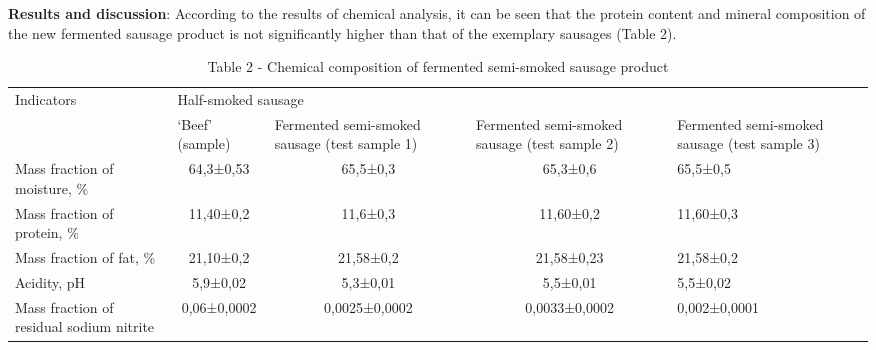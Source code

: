 {\bfseries Results and discussion}: According to the results of chemical
analysis, it can be seen that the protein content and mineral
composition of the new fermented sausage product is not significantly
higher than that of the exemplary sausages (Table 2).

\begin{table}[H]
\caption*{Table 2 - Chemical composition of fermented semi-smoked sausage product}
\centering
\begin{tabular}{|l|llll|}
\hline
\multirow{2}{*}{Indicators}              & \multicolumn{4}{l|}{Half-smoked sausage}                                                                                                                                                                                       \\ \cline{2-5} 
                                         & \multicolumn{1}{l|}{‘Beef’ (sample)} & \multicolumn{1}{p{0.15\textwidth}|}{Fermented semi-smoked sausage (test sample 1)} & \multicolumn{1}{p{0.15\textwidth}|}{Fermented semi-smoked sausage (test sample 2)} & \multicolumn{1}{p{0.15\textwidth}|}{Fermented semi-smoked sausage (test sample 3)} \\ \hline
Mass fraction of moisture, \%            & \multicolumn{1}{c|}{64,3±0,53}       & \multicolumn{1}{c|}{65,5±0,3}                                      & \multicolumn{1}{c|}{65,3±0,6}                                      & 65,5±0,5                                      \\ \hline
Mass fraction of protein, \%             & \multicolumn{1}{c|}{11,40±0,2}       & \multicolumn{1}{c|}{11,6±0,3}                                      & \multicolumn{1}{c|}{11,60±0,2}                                     & 11,60±0,3                                     \\ \hline
Mass fraction of fat, \%                 & \multicolumn{1}{c|}{21,10±0,2}       & \multicolumn{1}{c|}{21,58±0,2}                                     & \multicolumn{1}{c|}{21,58±0,23}                                    & 21,58±0,2                                     \\ \hline
Acidity, pH                              & \multicolumn{1}{c|}{5,9±0,02}        & \multicolumn{1}{c|}{5,3±0,01}                                      & \multicolumn{1}{c|}{5,5±0,01}                                      & 5,5±0,02                                      \\ \hline
\multicolumn{1}{|p{0.25\textwidth}|}{Mass fraction of residual sodium nitrite} & \multicolumn{1}{c|}{0,06±0,0002}     & \multicolumn{1}{c|}{0,0025±0,0002}                                 & \multicolumn{1}{c|}{0,0033±0,0002}                                 & 0,002±0,0001                                  \\ \hline
\end{tabular}
\end{table}

